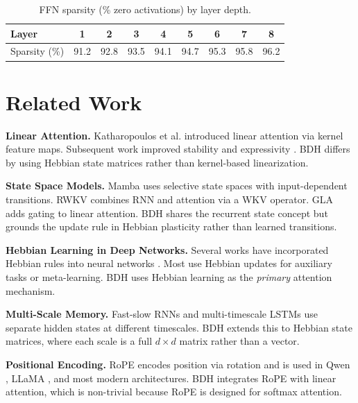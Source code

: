 \documentclass{article}
\begin{document}
\begin{table}[t]
    \centering
    \caption{FFN sparsity (\% zero activations) by layer depth.}
    \label{tab:sparsity}
    \begin{tabular}{@{}lcccccccc@{}}
        \toprule
        \textbf{Layer} & 1 & 2 & 3 & 4 & 5 & 6 & 7 & 8 \\
        \midrule
        Sparsity (\%) & 91.2 & 92.8 & 93.5 & 94.1 & 94.7 & 95.3 & 95.8 & 96.2 \\
        \bottomrule
    \end{tabular}
\end{table}

\section{Related Work}

\textbf{Linear Attention.} Katharopoulos et al. \citep{katharopoulos2018transformers} introduced linear attention via kernel feature maps. Subsequent work improved stability \citep{qin2022devil} and expressivity \citep{peng2023rwkv}. BDH differs by using Hebbian state matrices rather than kernel-based linearization.

\textbf{State Space Models.} Mamba \citep{gu2023mamba} uses selective state spaces with input-dependent transitions. RWKV \citep{peng2023rwkv} combines RNN and attention via a WKV operator. GLA \citep{gu2023gated} adds gating to linear attention. BDH shares the recurrent state concept but grounds the update rule in Hebbian plasticity rather than learned transitions.

\textbf{Hebbian Learning in Deep Networks.} Several works have incorporated Hebbian rules into neural networks \citep{krotov2016dense, miconi2018backprop, rapp2022hebbian}. Most use Hebbian updates for auxiliary tasks or meta-learning. BDH uses Hebbian learning as the \textit{primary} attention mechanism.

\textbf{Multi-Scale Memory.} Fast-slow RNNs \citep{mujika2017fast-slow} and multi-timescale LSTMs \citep{chung2016hierarchical} use separate hidden states at different timescales. BDH extends this to Hebbian state matrices, where each scale is a full $d \times d$ matrix rather than a vector.

\textbf{Positional Encoding.} RoPE \citep{su2024roformer} encodes position via rotation and is used in Qwen \citep{qwen2024qwen2}, LLaMA \citep{touvron2023llama}, and most modern architectures. BDH integrates RoPE with linear attention, which is non-trivial because RoPE is designed for softmax attention.
\end{document}

